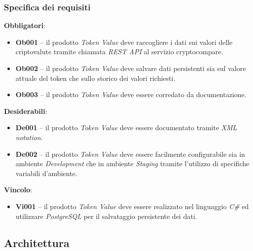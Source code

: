 \documentclass[11pt]{thesistemp}
\begin{document}
\subsubsection{Specifica dei requisiti}

\textbf{Obbligatori}:
\begin{itemize}
	\item \textbf{Ob001} – il prodotto \textit{Token Value} deve raccogliere i dati sui valori delle criptovalute tramite chiamata \textit{REST API} al servizio cryptocompare.
	\item \textbf{Ob002} – il prodotto \textit{Token Value} deve salvare dati persistenti sia sul valore attuale del token che sullo storico dei valori richiesti.
	\item \textbf{Ob003} – il prodotto \textit{Token Value} deve essere corredato da documentazione.
\end{itemize}
\textbf{Desiderabili}:
\begin{itemize}
	\item \textbf{De001} – il prodotto \textit{Token Value} deve essere documentato tramite\textit{ XML notation}.
	\item \textbf{De002} – il prodotto \textit{Token Value} deve essere facilmente configurabile sia in ambiente \textit{Development} che in ambiente \textit{Staging} tramite l’utilizzo di specifiche variabili d’ambiente.
\end{itemize}
\textbf{Vincolo}:
\begin{itemize}
	\item \textbf{Vi001} – il prodotto \textit{Token Value} deve essere realizzato nel linguaggio \textit{C\#} ed utilizzare \textit{PostgreSQL} per il salvataggio persistente dei dati.
\end{itemize}
\pagebreak

\subsection{Architettura}
\end{document}
